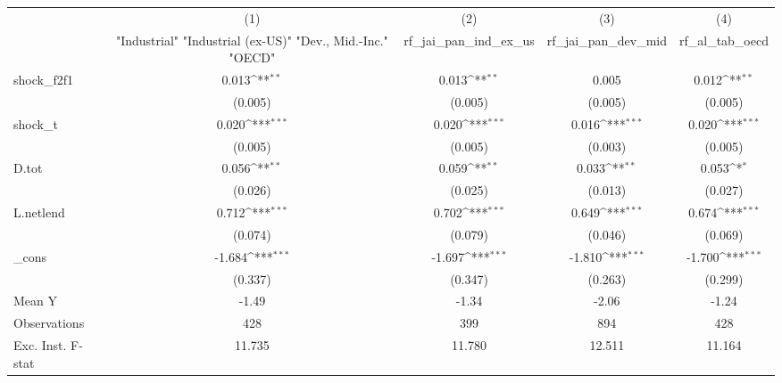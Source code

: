 {
\def\sym#1{\ifmmode^{#1}\else\(^{#1}\)\fi}
\begin{tabular}{l*{4}{c}}
\toprule
            &\multicolumn{1}{c}{(1)}&\multicolumn{1}{c}{(2)}&\multicolumn{1}{c}{(3)}&\multicolumn{1}{c}{(4)}\\
            &\multicolumn{1}{c}{ "Industrial" "Industrial (ex-US)" "Dev., Mid.-Inc." "OECD" }&\multicolumn{1}{c}{rf\_jai\_pan\_ind\_ex\_us}&\multicolumn{1}{c}{rf\_jai\_pan\_dev\_mid}&\multicolumn{1}{c}{rf\_al\_tab\_oecd}\\
\midrule
shock\_f2f1  &       0.013\sym{**} &       0.013\sym{**} &       0.005         &       0.012\sym{**} \\
            &     (0.005)         &     (0.005)         &     (0.005)         &     (0.005)         \\
\addlinespace
shock\_t     &       0.020\sym{***}&       0.020\sym{***}&       0.016\sym{***}&       0.020\sym{***}\\
            &     (0.005)         &     (0.005)         &     (0.003)         &     (0.005)         \\
\addlinespace
D.tot       &       0.056\sym{**} &       0.059\sym{**} &       0.033\sym{**} &       0.053\sym{*}  \\
            &     (0.026)         &     (0.025)         &     (0.013)         &     (0.027)         \\
\addlinespace
L.netlend   &       0.712\sym{***}&       0.702\sym{***}&       0.649\sym{***}&       0.674\sym{***}\\
            &     (0.074)         &     (0.079)         &     (0.046)         &     (0.069)         \\
\addlinespace
\_cons      &      -1.684\sym{***}&      -1.697\sym{***}&      -1.810\sym{***}&      -1.700\sym{***}\\
            &     (0.337)         &     (0.347)         &     (0.263)         &     (0.299)         \\
\midrule
Mean Y      &       -1.49         &       -1.34         &       -2.06         &       -1.24         \\
Observations&         428         &         399         &         894         &         428         \\
Exc. Inst. F-stat&      11.735         &      11.780         &      12.511         &      11.164         \\
\bottomrule
\end{tabular}
}
